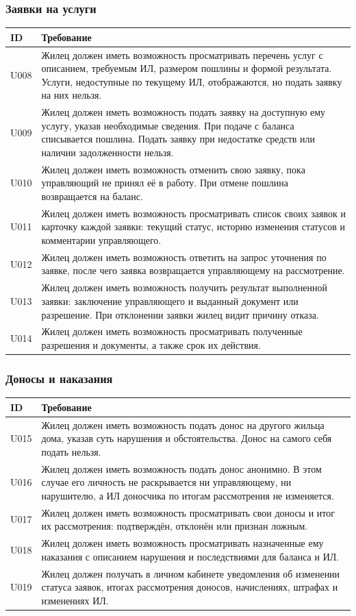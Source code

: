 \documentclass[12pt,a4paper]{article}
\newenvironment{reqtable}{%
  \begin{longtable}{L{14mm} L{146mm}}
  \toprule
  \textbf{ID} & \textbf{Требование} \\
  \midrule
  \endhead
  \bottomrule
  \endfoot
}{\end{longtable}}
\begin{document}
\subsubsection*{Заявки на услуги}
\begin{reqtable}
U008 & Жилец должен иметь возможность просматривать перечень услуг с описанием, требуемым ИЛ, размером пошлины и формой результата. Услуги, недоступные по текущему ИЛ, отображаются, но подать заявку на них нельзя. \\
U009 & Жилец должен иметь возможность подать заявку на доступную ему услугу, указав необходимые сведения. При подаче с баланса списывается пошлина. Подать заявку при недостатке средств или наличии задолженности нельзя. \\
U010 & Жилец должен иметь возможность отменить свою заявку, пока управляющий не принял её в работу. При отмене пошлина возвращается на баланс. \\
U011 & Жилец должен иметь возможность просматривать список своих заявок и карточку каждой заявки: текущий статус, историю изменения статусов и комментарии управляющего. \\
U012 & Жилец должен иметь возможность ответить на запрос уточнения по заявке, после чего заявка возвращается управляющему на рассмотрение. \\
U013 & Жилец должен иметь возможность получить результат выполненной заявки: заключение управляющего и выданный документ или разрешение. При отклонении заявки жилец видит причину отказа. \\
U014 & Жилец должен иметь возможность просматривать полученные разрешения и документы, а также срок их действия. \\
\end{reqtable}

\subsubsection*{Доносы и наказания}
\begin{reqtable}
U015 & Жилец должен иметь возможность подать донос на другого жильца дома, указав суть нарушения и обстоятельства. Донос на самого себя подать нельзя. \\
U016 & Жилец должен иметь возможность подать донос анонимно. В этом случае его личность не раскрывается ни управляющему, ни нарушителю, а ИЛ доносчика по итогам рассмотрения не изменяется. \\
U017 & Жилец должен иметь возможность просматривать свои доносы и итог их рассмотрения: подтверждён, отклонён или признан ложным. \\
U018 & Жилец должен иметь возможность просматривать назначенные ему наказания с описанием нарушения и последствиями для баланса и ИЛ. \\
U019 & Жилец должен получать в личном кабинете уведомления об изменении статуса заявок, итогах рассмотрения доносов, начислениях, штрафах и изменениях ИЛ. \\
\end{reqtable}
\end{document}
